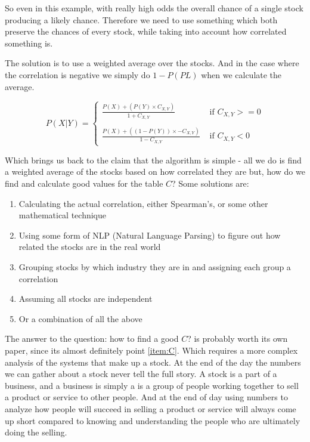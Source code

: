 \documentclass[11pt]{article}
\begin{document}
    So even in this example, with really high odds the overall chance of a single stock
    producing a likely chance. Therefore we need to use something which both preserve
    the chances of every stock, while taking into account how correlated something is.

    The solution is to use a weighted average over the stocks.
    And in the case where the correlation is negative we simply do \(1 - P(PL)\)
    when we calculate the average.

    \begin{equation} \label{eq:StockWeight}
        P ( X | Y ) = 
        \begin{cases}
            \displaystyle\frac 
                {P( X ) + (P ( Y ) \times C_{X, Y})}
                {1 + C_{X, Y}} 
                & \text{ if } C_{X, Y} >= 0\\
            \\
            \displaystyle\frac
                {P( X ) + ((1 - P ( Y )) \times - C_{X, Y})}
                {1 - C_{X, Y}} 
                & \text{ if } C_{X, Y} < 0
        \end{cases}
    \end{equation}

    Which brings us back to the claim that the algorithm is simple - all we do is find a
    weighted average of the stocks based on how correlated they are but, how do we find 
    and calculate good values for the table \(C\)? Some solutions are:

    \begin{enumerate}
        \item{Calculating the actual correlation, either Spearman's, or some other mathematical technique}
        \item{Using some form of NLP (Natural Language Parsing) to figure out how related the stocks are in the real world}
        \item{Grouping stocks by which industry they are in and assigning each group a correlation}
        \item{Assuming all stocks are independent}
        \item{Or a combination of all the above}\label{item:C}
    \end{enumerate}

    The answer to the question: how to find a good \(C\)? is probably worth its own paper, since
    its almost definitely point \ref{item:C}. Which requires a more complex analysis of the systems
    that make up a stock. At the end of the day the numbers we can gather about a stock never
    tell the full story. A stock is a part of a business, and a business is simply a is a
    group of people working together to sell a product or service to other people.
    And at the end of day using numbers to analyze how people will succeed in selling
    a product or service will always come up short compared to knowing and understanding
    the people who are ultimately doing the selling.
\end{document}
